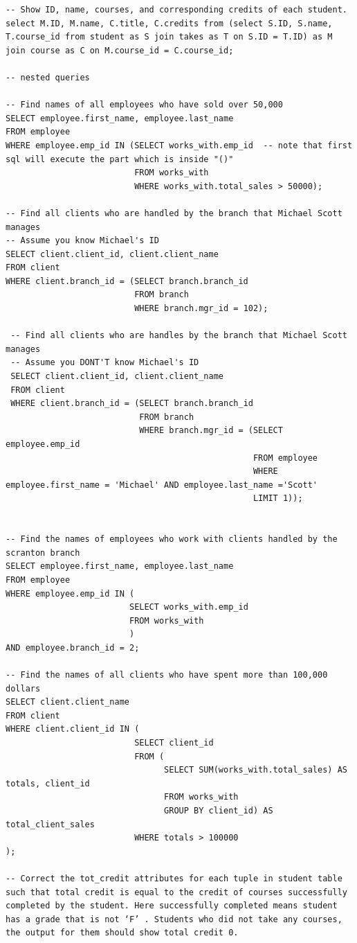 \documentclass[8pt, a4paper, oneside, twocolumn]{extarticle}
\begin{document}
\begin{verbatim}
-- Show ID, name, courses, and corresponding credits of each student.
select M.ID, M.name, C.title, C.credits from (select S.ID, S.name, T.course_id from student as S join takes as T on S.ID = T.ID) as M join course as C on M.course_id = C.course_id;

-- nested queries

-- Find names of all employees who have sold over 50,000
SELECT employee.first_name, employee.last_name
FROM employee
WHERE employee.emp_id IN (SELECT works_with.emp_id  -- note that first sql will execute the part which is inside "()"
                          FROM works_with
                          WHERE works_with.total_sales > 50000);

-- Find all clients who are handled by the branch that Michael Scott manages
-- Assume you know Michael's ID
SELECT client.client_id, client.client_name
FROM client
WHERE client.branch_id = (SELECT branch.branch_id
                          FROM branch
                          WHERE branch.mgr_id = 102);

 -- Find all clients who are handles by the branch that Michael Scott manages
 -- Assume you DONT'T know Michael's ID
 SELECT client.client_id, client.client_name
 FROM client
 WHERE client.branch_id = (SELECT branch.branch_id
                           FROM branch
                           WHERE branch.mgr_id = (SELECT employee.emp_id
                                                  FROM employee
                                                  WHERE employee.first_name = 'Michael' AND employee.last_name ='Scott'
                                                  LIMIT 1));


-- Find the names of employees who work with clients handled by the scranton branch
SELECT employee.first_name, employee.last_name
FROM employee
WHERE employee.emp_id IN (
                         SELECT works_with.emp_id
                         FROM works_with
                         )
AND employee.branch_id = 2;

-- Find the names of all clients who have spent more than 100,000 dollars
SELECT client.client_name
FROM client
WHERE client.client_id IN (
                          SELECT client_id
                          FROM (
                                SELECT SUM(works_with.total_sales) AS totals, client_id
                                FROM works_with
                                GROUP BY client_id) AS total_client_sales
                          WHERE totals > 100000
);

-- Correct the tot_credit attributes for each tuple in student table such that total credit is equal to the credit of courses successfully completed by the student. Here successfully completed means student has a grade that is not ‘F’ . Students who did not take any courses, the output for them should show total credit 0.


\end{verbatim}
\end{document}
